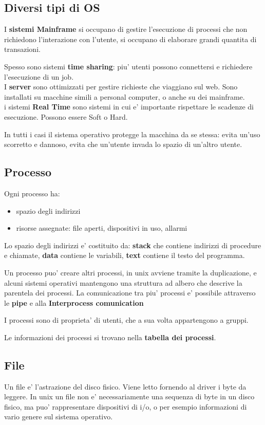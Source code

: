 \subsection{Diversi tipi di OS}
I \textbf{sistemi Mainframe} si occupano di gestire l'esecuzione di 
processi che non richiedono l'interazione con l'utente, si occupano di
elaborare grandi quantita di transazioni.

Spesso sono sistemi \textbf{time sharing}: piu' utenti possono connettersi e richiedere
l'esecuzione di un job. \\

I \textbf{server} sono ottimizzati per gestire richieste che viaggiano 
sul web. Sono installati su macchine simili a personal computer, o anche su dei mainframe. \\

i sistemi \textbf{Real Time} sono sistemi in cui e' importante rispettare 
le scadenze di esecuzione. Possono essere Soft o Hard.

In tutti i casi il sistema operativo protegge la macchina da se stessa: evita un'uso 
scorretto e dannoso, evita che un'utente invada lo spazio di un'altro utente.

\subsection{Processo}
Ogni processo ha:
\begin{itemize}
    \item spazio degli indirizzi
    \item risorse assegnate: file aperti, dispositivi in uso, allarmi
\end{itemize}

Lo spazio degli indirizzi e' costituito da: 
\textbf{stack} che contiene indirizzi di procedure e chiamate, \textbf{data} contiene le variabili, 
\textbf{text} contiene il testo del programma.

Un processo puo' creare altri processi, in unix avviene tramite la duplicazione,
e alcuni sistemi operativi mantengono una struttura ad albero che descrive la parentela dei processi.
La comunicazione tra piu' processi e' possibile attraverso le \textbf{pipe} e alla \textbf{Interprocess comunication}

I processi sono di proprieta' di utenti, che a sua volta appartengono a gruppi.

Le informazioni dei processi si trovano nella \textbf{tabella dei processi}.

\subsection{File}
Un file e' l'astrazione del disco fisico. Viene letto fornendo al driver 
i byte da leggere. 
In unix un file non e' necessariamente una sequenza di byte in un disco fisico,
ma puo' rappresentare dispositivi di i/o, o per esempio informazioni di vario genere
sul sistema operativo. \\

